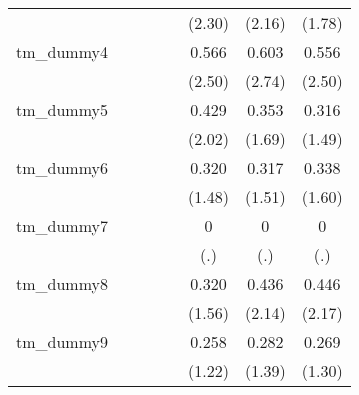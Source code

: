 {\begin{tabular}{l*{7}{c}}
            &                     &                     &                     &                     &      (2.30)         &      (2.16)         &      (1.78)         \\
[1em]
tm\_dummy4   &                     &                     &                     &                     &       0.566\sym{*}  &       0.603\sym{**} &       0.556\sym{*}  \\
            &                     &                     &                     &                     &      (2.50)         &      (2.74)         &      (2.50)         \\
[1em]
tm\_dummy5   &                     &                     &                     &                     &       0.429\sym{*}  &       0.353         &       0.316         \\
            &                     &                     &                     &                     &      (2.02)         &      (1.69)         &      (1.49)         \\
[1em]
tm\_dummy6   &                     &                     &                     &                     &       0.320         &       0.317         &       0.338         \\
            &                     &                     &                     &                     &      (1.48)         &      (1.51)         &      (1.60)         \\
[1em]
tm\_dummy7   &                     &                     &                     &                     &           0         &           0         &           0         \\
            &                     &                     &                     &                     &         (.)         &         (.)         &         (.)         \\
[1em]
tm\_dummy8   &                     &                     &                     &                     &       0.320         &       0.436\sym{*}  &       0.446\sym{*}  \\
            &                     &                     &                     &                     &      (1.56)         &      (2.14)         &      (2.17)         \\
[1em]
tm\_dummy9   &                     &                     &                     &                     &       0.258         &       0.282         &       0.269         \\
            &                     &                     &                     &                     &      (1.22)         &      (1.39)         &      (1.30)         \\

\end{tabular}}
